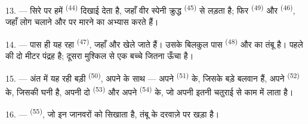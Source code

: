 13. --- सिरे पर हमें  \textsuperscript{(44)} दिखाई देता है, जहाँ
वीर स्पेनी  क्रुद्ध  \textsuperscript{(45)} से
लड़ता है; फिर  \textsuperscript{(49)} और
 \textsuperscript{(46)}, जहाँ लोग 
चलाने और  पर मारने का अभ्यास करते हैं।

14. --- पास ही यह रहा  \textsuperscript{(47)}, जहाँ
 और  खेले जाते हैं। उसके बिलकुल पास
 \textsuperscript{(48)} और  का तंबू है। पहले की
 दो मीटर पंद्रह है; दूसरा मुश्किल से एक बच्चे जितना ऊँचा है।

15. --- अंत में यह रही बड़ी  \textsuperscript{(50)}, अपने
 के साथ — अपने  \textsuperscript{(51)} के, जिसके
 बड़े बलवान हैं, अपने  \textsuperscript{(52)} के, जिसकी
 घनी है, अपनी दो  \textsuperscript{(53)} और अपने
 \textsuperscript{(54)} के, जो अपनी  इतनी चतुराई से काम
में लाता है।

16. ---  \textsuperscript{(55)}, जो इन जानवरों को
सिखाता है, तंबू के दरवाज़े पर खड़ा है।
\VUsaut{6.0mm}
\VUfilet{22mm}
